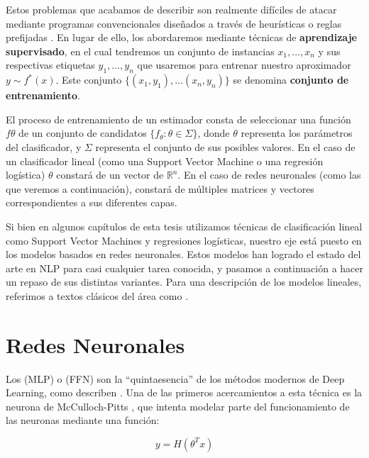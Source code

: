 Estos problemas que acabamos de describir son realmente difíciles de atacar mediante programas convencionales diseñados a través de heurísticas o reglas prefijadas \cite{bishop2006pattern}. En lugar de ello, los abordaremos mediante técnicas de \textbf{aprendizaje supervisado}, en el cual tendremos un conjunto de instancias $x_1, \ldots, x_n$ y sus respectivas etiquetas $y_1, \ldots , y_n$ que usaremos para entrenar nuestro aproximador $y \sim f^*(x)$. Este conjunto $\{ (x_1, y_1), \ldots (x_n, y_n)\}$ se denomina \textbf{conjunto de entrenamiento}.

El proceso de entrenamiento de un estimador consta de seleccionar una función $f\theta$ de un conjunto de candidatos $\{f_\theta: \theta \in \Sigma\}$, donde $\theta$ representa los parámetros del clasificador, y $\Sigma$ representa el conjunto de sus posibles valores. En el caso de un clasificador lineal (como una Support Vector Machine o una regresión logística) $\theta$ constará de un vector de $\mathbb{R}^n$. En el caso de redes neuronales (como las que veremos a continuación), constará de múltiples matrices y vectores correspondientes a sus diferentes capas.


Si bien en algunos capítulos de esta tesis utilizamos técnicas de clasificación lineal como Support Vector Machines y regresiones logísticas, nuestro eje está puesto en los modelos basados en redes neuronales. Estos modelos han logrado el estado del arte en NLP para casi cualquier tarea conocida, y pasamos a continuación a hacer un repaso de sus distintas variantes. Para una descripción de los modelos lineales, referimos a textos clásicos del área como \citet{bishop2006pattern}.

\section{Redes Neuronales}


Los  (MLP) o  (FFN) son la ``quintaesencia'' de los métodos modernos de Deep Learning, como describen \citet{goodfellow2016deep}. Una de las primeros acercamientos a esta técnica es la neurona de McCulloch-Pitts \cite{mcculloch1943logical}, que intenta modelar parte del funcionamiento de las neuronas mediante una función:

\begin{equation*}
    y = H(\theta^T x)
\end{equation*}


